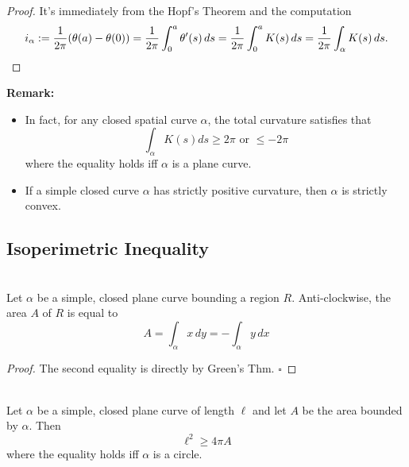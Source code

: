 \begin{proof}
It's immediately from the Hopf's Theorem and the computation
\[
i_\alpha := \frac{1}{2\pi}(\theta(a) - \theta(0)) = \frac{1}{2\pi}\int_0^a \theta'(s)\,ds = \frac{1}{2\pi}\int_0^a K(s)\,ds = \frac{1}{2\pi}\int_\alpha K(s)\,ds. \qedhere
\]
\end{proof}

\noindent\textbf{Remark:} \begin{itemize}
    \item In fact, for any closed spatial curve $\alpha$, the total curvature satisfies that
\[
\int_\alpha K(s)ds \geq 2\pi \text{ or } \leq -2\pi
\]
where the equality holds iff $\alpha$ is a plane curve.

    \item If a simple closed curve $\alpha$ has strictly positive curvature, then $\alpha$ is strictly convex.
\end{itemize}

\subsection{Isoperimetric Inequality}

\\
Let $\alpha$ be a simple, closed plane curve bounding a region $R$. Anti-clockwise, the area $A$ of $R$ is equal to
\[
A = \int_\alpha x\,dy = -\int_\alpha y\,dx
\]

\begin{proof}
The second equality is directly by Green's Thm. \quad$\square$
\end{proof}

\\
Let $\alpha$ be a simple, closed plane curve of length $\ell$ and let $A$ be the area bounded by $\alpha$. Then
\[
\ell^2 \geq 4\pi A
\]
where the equality holds iff $\alpha$ is a circle.

